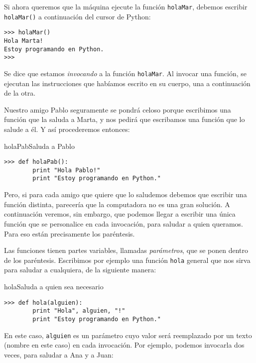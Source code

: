 Si ahora queremos que la máquina ejecute la función
\lstinline!holaMar!, debemos escribir \lstinline!holaMar()! a continuación
del cursor de Python:

\begin{lstlisting}[numbers=none]
>>> holaMar()
Hola Marta!
Estoy programando en Python.
>>>
\end{lstlisting}

Se dice que estamos {\it invocando} a la función \lstinline!holaMar!.
Al invocar una función, se ejecutan las instrucciones que habíamos
escrito en su cuerpo, una a continuación de la otra.

Nuestro amigo Pablo seguramente se pondrá celoso porque escribimos
una función que la saluda a Marta, y nos pedirá que escribamos una
función que lo salude a él. Y así procederemos entonces:

\begin{codigo}{holaPab}{Saluda a Pablo}
\begin{lstlisting}[numbers=none]
>>> def holaPab():
        print "Hola Pablo!"
        print "Estoy programando en Python."
\end{lstlisting}
\end{codigo}

Pero, si para cada amigo que quiere que lo saludemos debemos que
escribir una función distinta, parecería que la computadora no es
una gran solución. A continuación veremos, sin embargo, que
podemos llegar a escribir una única función que se personalice en
cada invocación, para saludar a quien queramos. Para eso están
precisamente los paréntesis.

Las funciones tienen partes variables, llamadas {\it parámetros},
que se ponen dentro de los paréntesis. Escribimos por ejemplo una
función \lstinline!hola! general que nos sirva para saludar a
cualquiera, de la siguiente manera:

\begin{codigo}{hola}{Saluda a quien sea necesario}
\begin{lstlisting}[numbers=none]
>>> def hola(alguien):
        print "Hola", alguien, "!"
        print "Estoy programando en Python."
\end{lstlisting}
\end{codigo}

En este caso, \lstinline!alguien! es un parámetro cuyo valor será reemplazado
por un texto (nombre en este caso) en cada invocación.  Por ejemplo, podemos
invocarla dos veces, para saludar a Ana y a Juan:

